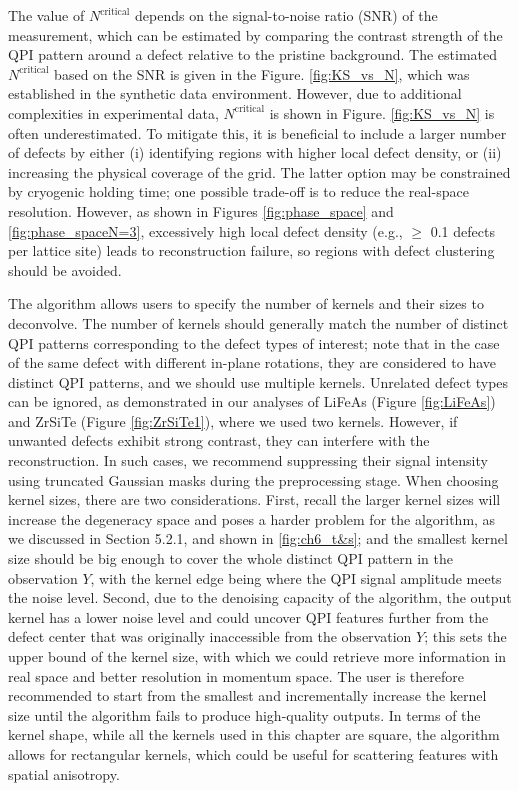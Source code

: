The value of $N^{\text{critical}}$ depends on the signal-to-noise ratio (SNR) of the measurement, which can be estimated by comparing the contrast strength of the QPI pattern around a defect relative to the pristine background. The estimated $N^{\text{critical}}$ based on the SNR is given in the Figure. \ref{fig:KS_vs_N}, which was established in the synthetic data environment. However, due to additional complexities in experimental data, $N^{\text{critical}}$ is shown in Figure. \ref{fig:KS_vs_N} is often underestimated. To mitigate this, it is beneficial to include a larger number of defects by either (i) identifying regions with higher local defect density, or (ii) increasing the physical coverage of the grid. The latter option may be constrained by cryogenic holding time; one possible trade-off is to reduce the real-space resolution. However, as shown in Figures \ref{fig:phase_space} and \ref{fig:phase_spaceN=3}, excessively high local defect density (e.g., $\geq$ 0.1 defects per lattice site) leads to reconstruction failure, so regions with defect clustering should be avoided.

The algorithm allows users to specify the number of kernels and their sizes to deconvolve. The number of kernels should generally match the number of distinct QPI patterns corresponding to the defect types of interest; note that in the case of the same defect with different in-plane rotations, they are considered to have distinct QPI patterns, and we should use multiple kernels. Unrelated defect types can be ignored, as demonstrated in our analyses of LiFeAs (Figure \ref{fig:LiFeAs}) and ZrSiTe (Figure \ref{fig:ZrSiTe1}), where we used two kernels. However, if unwanted defects exhibit strong contrast, they can interfere with the reconstruction. In such cases, we recommend suppressing their signal intensity using truncated Gaussian masks during the preprocessing stage. When choosing kernel sizes, there are two considerations. First, recall the larger kernel sizes will increase the degeneracy space and poses a harder problem for the algorithm, as we discussed in Section 5.2.1, and shown in \ref{fig:ch6_t&s}; and the smallest kernel size should be big enough to cover the whole distinct QPI pattern in the observation $Y$, with the kernel edge being where the QPI signal amplitude meets the noise level. Second, due to the denoising capacity of the algorithm, the output kernel has a lower noise level and could uncover QPI features further from the defect center that was originally inaccessible from the observation $Y$; this sets the upper bound of the kernel size, with which we could retrieve more information in real space and better resolution in momentum space. The user is therefore recommended to start from the smallest and incrementally increase the kernel size until the algorithm fails to produce high-quality outputs. In terms of the kernel shape, while all the kernels used in this chapter are square, the algorithm allows for rectangular kernels, which could be useful for scattering features with spatial anisotropy.

